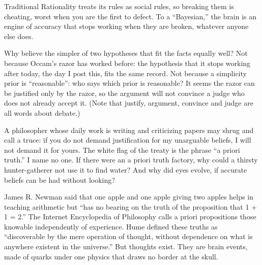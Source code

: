
Traditional Rationality treats its rules as social rules, so breaking them is cheating, worst when you are the first to defect. To a ``Bayesian,'' the brain is an engine of accuracy that stops working when they are broken, whatever anyone else does.

Why believe the simpler of two hypotheses that fit the facts equally well? Not because Occam's razor has worked before: the hypothesis that it stops working after today, the day I post this, fits the same record. Not because a simplicity prior is ``reasonable'': who says which prior is reasonable? It seems the razor can be justified only by the razor, so the argument will not convince a judge who does not already accept it. (Note that justify, argument, convince and judge are all words about debate.) 

A philosopher whose daily work is writing and criticizing papers may shrug and call a truce: if you do not demand justification for my unarguable beliefs, I will not demand it for yours. The white flag of the treaty is the phrase ``a priori truth.'' I name no one.  If there were an a priori truth factory, why could a thirsty hunter-gatherer not use it to find water? And why did eyes evolve, if accurate beliefs can be had without looking? 

James R. Newman said that one apple and one apple giving two apples helps in teaching arithmetic but ``has no bearing on the truth of the proposition that 1 + 1 = 2.'' The Internet Encyclopedia of Philosophy calls a priori propositions those knowable independently of experience. Hume defined these truths as ``discoverable by the mere operation of thought, without dependence on what is anywhere existent in the universe.'' But thoughts exist. They are brain events, made of quarks under one physics that draws no border at the skull.

